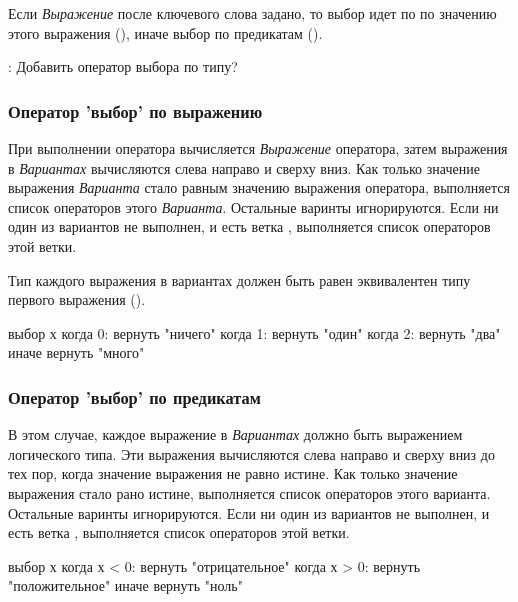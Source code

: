 Если  \emph{Выражение} после ключевого слова  задано, 
то выбор идет по по значению этого выражения (), иначе выбор по предикатам ().

\bigskip
\TBD: Добавить оператор выбора по типу?

\hypertarget{switch-stmt-expr}{%
\subsubsection{Оператор 'выбор' по выражению}\label{stmt:switch-stmt-expr}}

При выполнении оператора  вычисляется \emph{Выражение} оператора,
затем выражения в \emph{Вариантах} вычисляются слева направо и сверху вниз. 
Как только значение выражения \emph{Варианта} стало равным значению выражения оператора, выполняется список операторов этого \emph{Варианта}.
Остальные варинты игнорируются.
Если ни один из вариантов не выполнен, и есть ветка , выполняется список операторов этой ветки.

Тип каждого выражения в вариантах должен быть равен эквивалентен типу первого выражения ().

\begin{Trivil}
выбор х {
когда 0: вернуть "ничего"
когда 1: вернуть "один"
когда 2: вернуть "два"
иначе вернуть "много"
}
\end{Trivil}

\hypertarget{switch-stmt-predicate}{%
\subsubsection{Оператор 'выбор' по предикатам}\label{stmt:switch-stmt-predicate}}

В этом случае, каждое выражение в \emph{Вариантах} должно быть выражением логического типа. 
Эти выражения вычисляются  слева направо и сверху вниз до тех пор, когда значение выражения не равно истине. 
Как только значение выражения стало рано истине, выполняется список операторов этого варианта. Остальные варинты игнорируются.
Если ни один из вариантов не выполнен, и есть ветка , выполняется список операторов этой ветки.

\begin{Trivil}
выбор х {
когда х < 0: вернуть "отрицательное"
когда х > 0: вернуть "положительное"
иначе вернуть "ноль"
}
\end{Trivil}

